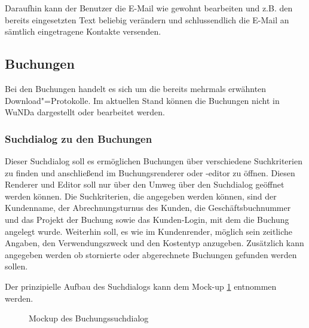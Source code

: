 Daraufhin kann der Benutzer die E-Mail wie gewohnt bearbeiten und z.B. den bereits eingesetzten Text beliebig verändern und schlussendlich die E-Mail an sämtlich eingetragene Kontakte versenden.


\subsection{Buchungen}
Bei den Buchungen handelt es sich um die bereits mehrmals erwähnten Download"=Protokolle. Im aktuellen Stand können die Buchungen nicht in \ac{WuNDa} dargestellt oder bearbeitet werden.

\subsubsection{Suchdialog zu den Buchungen}
Dieser Suchdialog soll es ermöglichen Buchungen über verschiedene Suchkriterien zu finden und anschließend im Buchungsrenderer oder -editor zu öffnen.
Diesen Renderer und Editor soll nur über den Umweg über den Suchdialog geöffnet werden können. 
Die Suchkriterien, die angegeben werden können, sind der Kundenname, der Abrechnungsturnus des Kunden, die Geschäftsbuchnummer und das Projekt der Buchung sowie das Kunden-Login, mit dem die Buchung angelegt wurde.
Weiterhin soll, es wie im Kundenrender, möglich sein zeitliche Angaben, den Verwendungszweck und den Kostentyp anzugeben. Zusätzlich kann angegeben werden ob stornierte oder abgerechnete Buchungen gefunden werden sollen.

Der prinzipielle Aufbau des Suchdialogs kann dem Mock-up \ref{fig:mockup-buchungssuchdialog} entnommen werden.
\begin{figure}[htbp]
	\centering
	\caption{Mockup des Buchungssuchdialog}
	\label{fig:mockup-buchungssuchdialog}
\end{figure}


